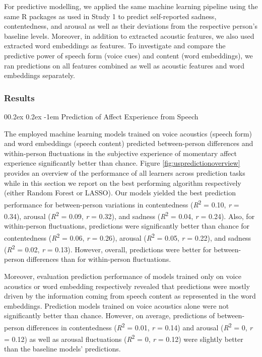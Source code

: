 \documentclass[
  man,floatsintext]{apa6}
\makeatletter
\let\oldparagraph\paragraph
\renewcommand{\paragraph}[1]{\oldparagraph{#1}\mbox{}}
\renewcommand{\paragraph}{\@startsection{paragraph}{4}{\parindent}%
  {0\baselineskip \@plus 0.2ex \@minus 0.2ex}%
  {-1em}%
  {\normalfont\normalsize\bfseries\itshape\typesectitle}}
\makeatother
\begin{document}
For predictive modelling, we applied the same machine learning pipeline using the same R packages as used in Study 1 to predict self-reported sadness, contentedness, and arousal as well as their deviations from the respective person's baseline levels. Moreover, in addition to extracted acoustic features, we also used extracted word embeddings as features. To investigate and compare the predictive power of speech form (voice cues) and content (word embeddings), we ran predictions on all features combined as well as acoustic features and word embeddings separately.

\hypertarget{results-1}{%
\subsubsection{Results}\label{results-1}}

\hypertarget{prediction-of-affect-experience-from-speech}{%
\paragraph{Prediction of Affect Experience from Speech}\label{prediction-of-affect-experience-from-speech}}

The employed machine learning models trained on voice acoustics (speech form) and word embeddings (speech content) predicted between-person differences and within-person fluctuations in the subjective experience of momentary affect experience significantly better than chance. Figure \ref{fig:uspredictionoverview} provides an overview of the performance of all learners across prediction tasks while in this section we report on the best performing algorithm respectively (either Random Forest or LASSO).
Our models yielded the best prediction performance for between-person variations in contentedness (\emph{R}\textsuperscript{2} = 0.10, \emph{r} = 0.34), arousal (\emph{R}\textsuperscript{2} = 0.09, \emph{r} = 0.32), and sadness (\emph{R}\textsuperscript{2} = 0.04, \emph{r} = 0.24). Also, for within-person fluctuations, predictions were significantly better than chance for contentedness (\emph{R}\textsuperscript{2} = 0.06, \emph{r} = 0.26), arousal (\emph{R}\textsuperscript{2} = 0.05, \emph{r} = 0.22), and sadness (\emph{R}\textsuperscript{2} = 0.02, \emph{r} = 0.13). However, overall, predictions were better for between-person differences than for within-person fluctuations.

Moreover, evaluation prediction performance of models trained only on voice acoustics or word embedding respectively revealed that predictions were mostly driven by the information coming from speech content as represented in the word embeddings. Prediction models trained on voice acoustics alone were not significantly better than chance. However, on average, predictions of between-person differences in contentedness (\emph{R}\textsuperscript{2} = 0.01, \emph{r} = 0.14) and arousal (\emph{R}\textsuperscript{2} = 0, \emph{r} = 0.12) as well as arousal fluctuations (\emph{R}\textsuperscript{2} = 0, \emph{r} = 0.12) were slightly better than the baseline models' predictions.
\end{document}
